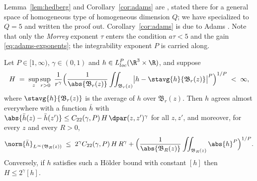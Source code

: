 \documentclass[11pt,reqno]{amsart}
\begin{document}
\begin{remark}\label{rem:adams-source}
Lemma~\ref{lem:hedberg} and Corollary~\ref{cor:adams} are
\cite[Lemma 5.3 and Corollary 5.1, p.~93--94]{LemarieRieusset2016}, stated
there for a general space of homogeneous type of homogeneous dimension $Q$; we
have specialized to $Q=5$ and written the proof out. Corollary~\ref{cor:adams}
is due to Adams \cite{Adams1975}. Note that only the \emph{Morrey} exponent
$\tau$ enters the condition $a\tau<5$ and the gain
\eqref{eq:adams-exponents}; the integrability exponent $P$ is carried along.
\end{remark}

\begin{lemma}\label{lem:campanato}
Let $P\in[1,\infty)$, $\gamma\in(0,1)$ and $h\in L^{P}_{loc}(\R^{3}\times\R)$,
and suppose
\[
  H\;=\;\sup_{z}\sup_{r>0}\ \frac{1}{r^{\gamma}}
    \Bigl(\frac{1}{\abs{\mathfrak{B}_{r}(z)}}
      \iint_{\mathfrak{B}_{r}(z)}
        \bigl|h-\textstyle\stavg{h}{\mathfrak{B}_{r}(z)}\bigr|^{P}\Bigr)^{1/P}
  \;<\;\infty ,
\]
where $\stavg{h}{\mathfrak{B}_{r}(z)}$ is the average of $h$ over
$\mathfrak{B}_{r}(z)$. Then $h$ agrees almost everywhere with a function
$\bar h$ with
$\abs{\bar h(z)-\bar h(z')}\le C_{22}(\gamma,P)\,H\,\dpar(z,z')^{\gamma}$ for all
$z,z'$, and moreover, for every $z$ and every $R>0$,
\begin{equation}\label{eq:campanato-Linfty}
  \norm{\bar h}_{L^{\infty}(\mathfrak{B}_{R}(z))}
  \;\le\;2^{\gamma}C_{22}(\gamma,P)\,H\,R^{\gamma}
   +\Bigl(\frac1{\abs{\mathfrak{B}_{R}(z)}}
      \iint_{\mathfrak{B}_{R}(z)}\abs{h}^{P}\Bigr)^{1/P}.
\end{equation}
Conversely, if $h$ satisfies such a H\"older bound with constant $[h]$ then
$H\le2^{\gamma}[h]$.
\end{lemma}
\end{document}
